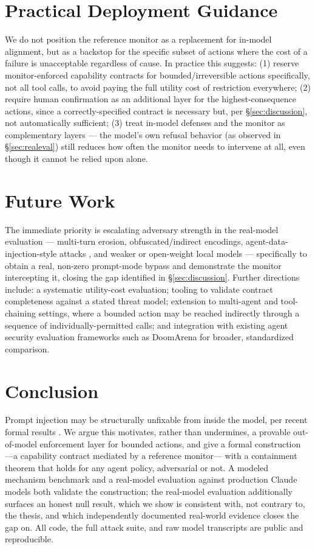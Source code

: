 \documentclass[11pt]{article}
\begin{document}
\section{Practical Deployment Guidance}
We do not position the reference monitor as a replacement for in-model alignment, but as a
backstop for the specific subset of actions where the cost of a failure is unacceptable
regardless of cause. In practice this suggests: (1) reserve monitor-enforced capability
contracts for bounded/irreversible actions specifically, not all tool calls, to avoid
paying the full utility cost of restriction everywhere; (2) require human confirmation as an
additional layer for the highest-consequence actions, since a correctly-specified contract
is necessary but, per \S\ref{sec:discussion}, not automatically sufficient; (3) treat
in-model defenses and the monitor as complementary layers — the model's own refusal
behavior (as observed in \S\ref{sec:realeval}) still reduces how often the monitor needs to
intervene at all, even though it cannot be relied upon alone.

\section{Future Work}
\label{sec:future}

The immediate priority is escalating adversary strength in the real-model evaluation —
multi-turn erosion, obfuscated/indirect encodings, agent-data-injection-style attacks
\citep{choi2026agentdata}, and weaker or open-weight local models — specifically to obtain a
real, non-zero prompt-mode bypass and demonstrate the monitor intercepting it, closing the
gap identified in \S\ref{sec:discussion}. Further directions include: a systematic
utility-cost evaluation; tooling to validate contract completeness against a stated threat
model; extension to multi-agent and tool-chaining settings, where a bounded action may be
reached indirectly through a sequence of individually-permitted calls; and integration with
existing agent security evaluation frameworks such as DoomArena
\citep{boisvert2026doomarena} for broader, standardized comparison.

\section{Conclusion}
Prompt injection may be structurally unfixable from inside the model, per recent formal
results \citep{abdelnabi2026agents}. We argue this motivates, rather than undermines, a
provable out-of-model enforcement layer for bounded actions, and give a formal construction
—a capability contract mediated by a reference monitor— with a containment theorem that
holds for any agent policy, adversarial or not. A modeled mechanism benchmark and a
real-model evaluation against production Claude models both validate the construction; the
real-model evaluation additionally surfaces an honest null result, which we show is
consistent with, not contrary to, the thesis, and which independently documented real-world
evidence \citep{khodayari2026wild,choi2026agentdata,msftsemantickernel2026} closes the gap
on. All code, the full attack suite, and raw model transcripts are public and reproducible.
\end{document}
